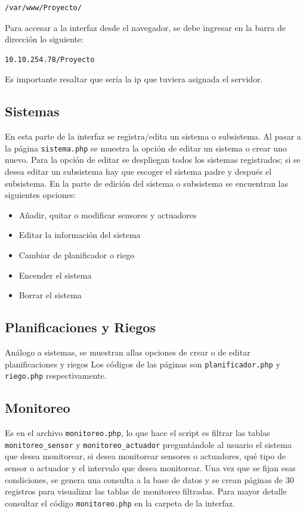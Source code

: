 \documentclass[10pt,twocolumn]{article}
\begin{document}
\begin{verbatim}
/var/www/Proyecto/
\end{verbatim}

Para accesar a la interfaz desde el navegador, se debe ingresar en la barra de direcci\'on lo siguiente:

\begin{verbatim}
10.10.254.78/Proyecto
\end{verbatim}

Es importante resaltar que ser\'ia la ip que tuviera asignada el servidor.

\subsection{Sistemas}
En esta parte de la interfaz se registra/edita un sistema o subsistema. Al pasar a la p\'agina \verb|sistema.php| se muestra la opci\'on de editar un sistema o 
crear uno nuevo. Para la opci\'on de editar se despliegan todos los sistemas registrados; si se desea editar un subsistema hay que escoger el sistema padre y despu\'es 
el subsistema. En la parte de edici\'on del sistema o subsistema se encuentran las siguientes opciones:

\begin{itemize}
\item A\~nadir, quitar o modificar sensores y actuadores
\item Editar la informaci\'on del sistema
\item Cambiar de planificador o riego
\item Encender el sistema
\item Borrar el sistema
\end{itemize}


\subsection{Planificaciones y Riegos}
An\'alogo a sistemas, se muestran allas opciones de crear o de editar planificaciones y riegos Los c\'odigos de las p\'aginas son \verb|planificador.php| y \verb|riego.php| 
respectivamente.

\subsection{Monitoreo}
Es en el archivo \verb|monitoreo.php|, lo que hace el script es filtrar las tablas \verb|monitoreo_sensor| y \verb|monitoreo_actuador| pregunt\'andole al 
usuario el sistema que desea monitorear, si desea monitorear sensores o actuadores, qu\'e tipo de sensor o actuador y el intervalo que desea monitorear. Una vez 
que se fijan esas condiciones, se genera una consulta a la base de datos y se crean p\'aginas de 30 registros para visualizar las tablas de monitoreo filtradas. 
Para mayor detalle consultar el c\'odigo \verb|monitoreo.php| en la carpeta de la interfaz.
\end{document}
